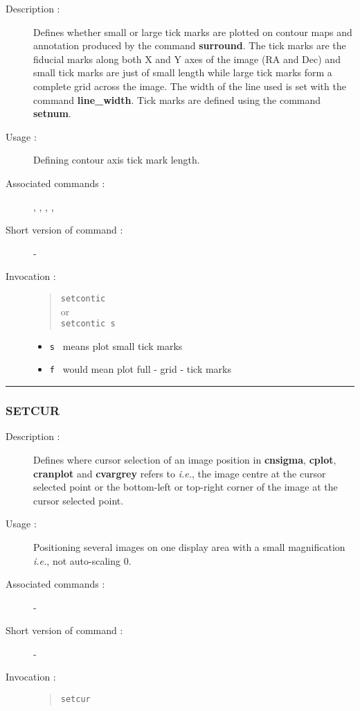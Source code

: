 \begin{description}

\item[Description :] Defines whether small or large tick marks are
plotted on contour maps and annotation produced by the command {\bf
surround}.  The tick marks are the fiducial marks along both X and Y
axes of the image (RA and Dec) and small tick marks are just of small
length while large tick marks form a complete grid across the image.
The width of the line used is set with the command {\bf line\_width}.
Tick marks are defined using the command {\bf setnum}.

\item[Usage :] Defining contour axis tick mark length.

\item[Associated commands :] {\tt {}},
{\tt {}}, {\tt {}},
{\tt {}}, {\tt {}}

\item[Short version of command :] -
\item[Invocation :]

\begin{quote}{\tt  setcontic }\\
or \\
{\tt setcontic s }
\end{quote}

\begin{itemize}
\item {\tt s } means plot small tick marks
\item {\tt f } would mean plot full - grid - tick marks
\end{itemize}

\end{description}

\hrule
\subsubsection*{\label{SETCUR}SETCUR}

\begin{description}

\item[Description :] Defines where cursor selection of an image
position in {\bf cnsigma}, {\bf cplot}, {\bf cranplot} and {\bf
cvargrey} refers to \emph{i.e.}, the image centre at the cursor
selected point or the bottom-left or top-right corner of the image at
the cursor selected point.

\item[Usage :] Positioning several images on one display
area with a small magnification \emph{i.e.}, not auto-scaling 0.

\item[Associated commands :] -
\item[Short version of command :] -
\item[Invocation :]

\begin{quote}{\tt  setcur }\end{quote}

\end{description}

